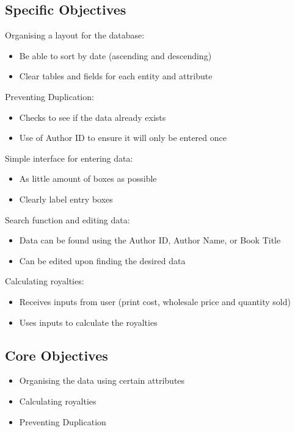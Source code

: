 \subsection{Specific Objectives}

Organising a layout for the database:

\begin{itemize}
    \item Be able to sort by date (ascending and descending)
    \item Clear tables and fields for each entity and attribute
\end{itemize}


Preventing Duplication:

\begin{itemize}
    \item Checks to see if the data already exists
    \item Use of Author ID to ensure it will only be entered once
\end{itemize}


Simple interface for entering data:

\begin{itemize}
    \item As little amount of boxes as possible
    \item Clearly label entry boxes
\end{itemize}


Search function and editing data:

\begin{itemize}
    \item Data can be found using the Author ID, Author Name, or Book Title
    \item Can be edited upon finding the desired data
\end{itemize}


Calculating royalties:

\begin{itemize}
    \item Receives inputs from user (print cost, wholesale price and quantity sold)
    \item Uses inputs to calculate the royalties
\end{itemize}

\subsection{Core Objectives}

\begin{itemize}
    \item Organising the data using certain attributes
    \item Calculating royalties
    \item Preventing Duplication
\end{itemize}

